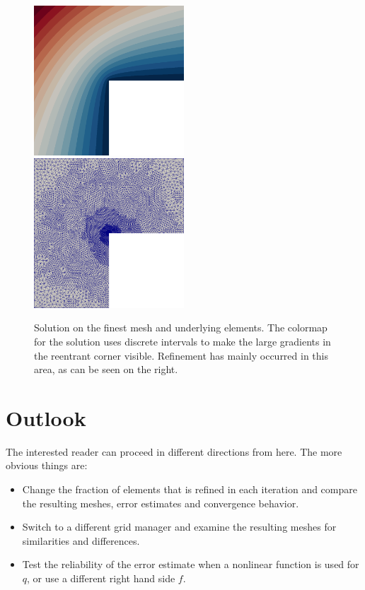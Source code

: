 \documentclass[a4paper,12pt]{article}
\begin{document}
\begin{figure}
\begin{center}
\includegraphics[width=0.499\textwidth]{solution}\hfill
\includegraphics[width=0.499\textwidth]{refined_mesh}
\end{center}
\caption{Solution on the finest mesh and underlying elements. The colormap
  for the solution uses discrete intervals to make the large gradients in
  the reentrant corner visible. Refinement has mainly occurred in this area,
  as can be seen on the right.}
  \label{fig:results}
\end{figure}

\section{Outlook}

The interested reader can proceed in different directions from here.
The more obvious things are:
\begin{itemize}
\item Change the fraction of elements that is refined in each iteration
  and compare the resulting meshes, error estimates and convergence
  behavior.
\item Switch to a different grid manager and examine the resulting meshes
  for similarities and differences.
\item Test the reliability of the error estimate when a nonlinear function
  is used for $q$, or use a different right hand side $f$.
\end{itemize}



\end{document}
